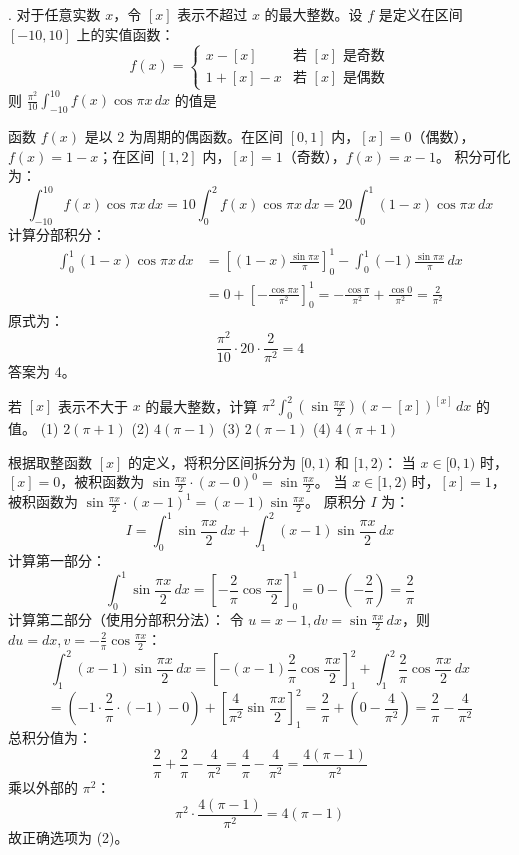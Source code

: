 \begin{questions}
    . 对于任意实数 \(x\)，令 \([x]\) 表示不超过 \(x\) 的最大整数。设 \(f\) 是定义在区间 \([-10, 10]\) 上的实值函数：
\[
f(x) = \begin{cases} x - [x] & \text{若 } [x] \text{ 是奇数} \\ 1 + [x] - x & \text{若 } [x] \text{ 是偶数} \end{cases}
\]
则 \(\frac{\pi^{2}}{10} \int_{-10}^{10} f(x) \cos \pi x \, dx\) 的值是

\begin{solution}
函数 \(f(x)\) 是以 2 为周期的偶函数。在区间 \([0, 1]\) 内，\([x] = 0\)（偶数），\(f(x) = 1 - x\)；在区间 \([1, 2]\) 内，\([x] = 1\)（奇数），\(f(x) = x - 1\)。
积分可化为：
\[
\int_{-10}^{10} f(x) \cos \pi x \, dx = 10 \int_{0}^{2} f(x) \cos \pi x \, dx = 20 \int_{0}^{1} (1 - x) \cos \pi x \, dx
\]
计算分部积分：
\begin{align*}
\int_{0}^{1} (1 - x) \cos \pi x \, dx &= \left[ (1 - x) \frac{\sin \pi x}{\pi} \right]_{0}^{1} - \int_{0}^{1} (-1) \frac{\sin \pi x}{\pi} \, dx \\
&= 0 + \left[ -\frac{\cos \pi x}{\pi^{2}} \right]_{0}^{1} = -\frac{\cos \pi}{\pi^{2}} + \frac{\cos 0}{\pi^{2}} = \frac{2}{\pi^{2}}
\end{align*}
原式为：
\[
\frac{\pi^{2}}{10} \cdot 20 \cdot \frac{2}{\pi^{2}} = 4
\]
答案为 4。
\end{solution}

    \question
若 $[x]$ 表示不大于 $x$ 的最大整数，计算 $\pi^2 \int_{0}^{2} \left( \sin \frac{\pi x}{2} \right) (x - [x])^{[x]} \, dx$ 的值。
(1) $2(\pi + 1)$ \quad (2) $4(\pi - 1)$ \quad (3) $2(\pi - 1)$ \quad (4) $4(\pi + 1)$

\begin{solution}
根据取整函数 $[x]$ 的定义，将积分区间拆分为 $[0, 1)$ 和 $[1, 2)$：
当 $x \in [0, 1)$ 时，$[x] = 0$，被积函数为 $\sin \frac{\pi x}{2} \cdot (x - 0)^0 = \sin \frac{\pi x}{2}$。
当 $x \in [1, 2)$ 时，$[x] = 1$，被积函数为 $\sin \frac{\pi x}{2} \cdot (x - 1)^1 = (x - 1) \sin \frac{\pi x}{2}$。
原积分 $I$ 为：
\[
I = \int_{0}^{1} \sin \frac{\pi x}{2} \, dx + \int_{1}^{2} (x - 1) \sin \frac{\pi x}{2} \, dx
\]
计算第一部分：
\[
\int_{0}^{1} \sin \frac{\pi x}{2} \, dx = \left[ -\frac{2}{\pi} \cos \frac{\pi x}{2} \right]_{0}^{1} = 0 - \left( -\frac{2}{\pi} \right) = \frac{2}{\pi}
\]
计算第二部分（使用分部积分法）：
令 $u = x - 1, dv = \sin \frac{\pi x}{2} \, dx$，则 $du = dx, v = -\frac{2}{\pi} \cos \frac{\pi x}{2}$：
\[
\int_{1}^{2} (x - 1) \sin \frac{\pi x}{2} \, dx = \left[ -(x - 1) \frac{2}{\pi} \cos \frac{\pi x}{2} \right]_{1}^{2} + \int_{1}^{2} \frac{2}{\pi} \cos \frac{\pi x}{2} \, dx
\]
\[
= \left( -1 \cdot \frac{2}{\pi} \cdot (-1) - 0 \right) + \left[ \frac{4}{\pi^2} \sin \frac{\pi x}{2} \right]_{1}^{2} = \frac{2}{\pi} + \left( 0 - \frac{4}{\pi^2} \right) = \frac{2}{\pi} - \frac{4}{\pi^2}
\]
总积分值为：
\[
\frac{2}{\pi} + \frac{2}{\pi} - \frac{4}{\pi^2} = \frac{4}{\pi} - \frac{4}{\pi^2} = \frac{4(\pi - 1)}{\pi^2}
\]
乘以外部的 $\pi^2$：
\[
\pi^2 \cdot \frac{4(\pi - 1)}{\pi^2} = 4(\pi - 1)
\]
故正确选项为 (2)。
\end{solution}


\end{questions}
